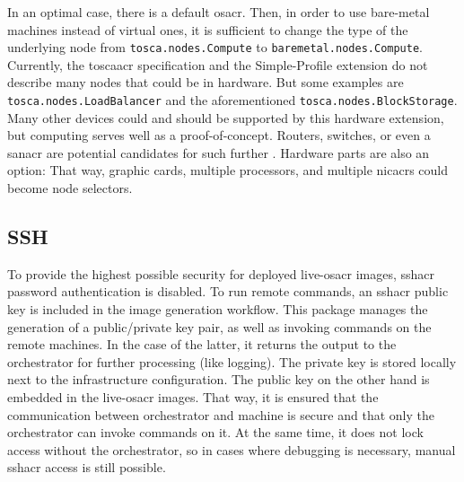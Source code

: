 \newline
In an optimal case, there is a default \gls{osacr}. Then, in order to use bare-metal machines instead of virtual ones, it is sufficient to change the type of the underlying node from \texttt{tosca.nodes.Compute} to \texttt{baremetal.nodes.Compute}.
\newline
Currently, the \gls{toscaacr} specification and the Simple-Profile extension do not describe many nodes that could be  in hardware. But some examples are \texttt{tosca.nodes.LoadBalancer} and the aforementioned \texttt{tosca.nodes.BlockStorage}. Many other devices could and should be supported by this hardware extension, but computing serves well as a proof-of-concept. Routers, switches, or even a \gls{sanacr} are potential candidates for such further . Hardware parts are also an option: That way, graphic cards, multiple processors, and multiple \gls{nicacr}s could become node selectors.

\subsection{SSH}
\label{chap:ssh}
To provide the highest possible security for deployed live-\gls{osacr} images, \gls{sshacr} password authentication is disabled. To run remote commands, an \gls{sshacr} public key is included in the image generation workflow. This package manages the generation of a public/private key pair, as well as invoking commands on the remote machines. In the case of the latter, it returns the output to the orchestrator for further processing (like logging). The private key is stored locally next to the infrastructure configuration. The public key on the other hand is embedded in the live-\gls{osacr} images. That way, it is ensured that the communication between orchestrator and machine is secure and that only the orchestrator can invoke commands on it. At the same time, it does not lock access without the orchestrator, so in cases where debugging is necessary, manual \gls{sshacr} access is still possible.
